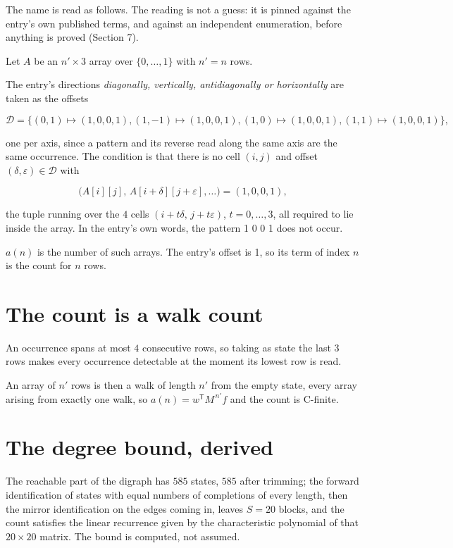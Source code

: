 \documentclass[11pt]{article}
\theoremstyle{definition}
\begin{document}
The name is read as follows. The reading is not a guess: it is pinned against the entry's own published terms, and against an independent enumeration, before anything is proved (Section 7).

Let $A$ be an $n' \times 3$ array over $\{0,\dots,1\}$ with $n' = n$ rows.

The entry's directions {\itshape diagonally, vertically, antidiagonally or horizontally} are taken as the offsets

\[\mathcal{D} = \{(0,1)\mapsto(1,0,0,1), (1,-1)\mapsto(1,0,0,1), (1,0)\mapsto(1,0,0,1), (1,1)\mapsto(1,0,0,1)\},\]

one per axis, since a pattern and its reverse read along the same axis are the same occurrence. The condition is that there is no cell $(i,j)$ and offset $(\delta,\varepsilon)\in\mathcal{D}$ with

\[\bigl(A[i][j],\,A[i{+}\delta][j{+}\varepsilon],\dots\bigr) = (1, 0, 0, 1),\]

the tuple running over the $4$ cells $(i+t\delta,\,j+t\varepsilon)$, $t = 0,\dots,3$, all required to lie inside the array. In the entry's own words, the pattern 1 0 0 1 does not occur.

$a(n)$ is the number of such arrays. The entry's offset is 1, so its term of index $n$ is the count for $n$ rows.

\section{The count is a walk count}

An occurrence spans at most $4$ consecutive rows, so taking as state the last $3$ rows makes every occurrence detectable at the moment its lowest row is read.

An array of $n'$ rows is then a walk of length $n'$ from the empty state, every array arising from exactly one walk, so $a(n) = w^{\mathsf T}M^{\,n'}f$ and the count is C-finite.

\section{The degree bound, derived}

The reachable part of the digraph has $585$ states, $585$ after trimming; the forward identification of states with equal numbers of completions of every length, then the mirror identification on the edges coming in, leaves $S = 20$ blocks, and the count satisfies the linear recurrence given by the characteristic polynomial of that $20\times20$ matrix. The bound is computed, not assumed.
\end{document}
